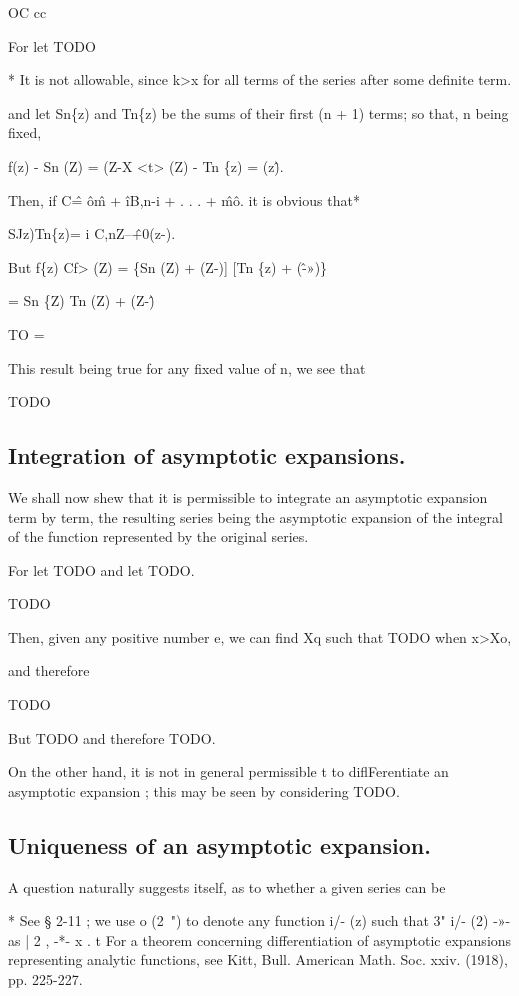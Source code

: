 OC cc

For let TODO

* It is not allowable, since k>x for all terms of the series after some definite term.

%
%
and let Sn\{z) and Tn\{z) be the sums of their first (n + 1) terms; so that,
n being fixed,

f(z) - Sn (Z) = (Z-X <t> (Z) - Tn \{z) = (z\^).

Then, if C\^ = \^o\^m + \^iB,n-i + . . . + \^m\^o. it is obvious that*

SJz)Tn\{z)= i C,nZ--\^+0(z-).

But f\{z) Cf> (Z) = \{Sn (Z) + (Z-)] [Tn \{z) + (\^-»)\}

= Sn \{Z) Tn (Z) + (Z-\^)

TO =

This result being true for any fixed value of n, we see that

TODO

\subsection{Integration of asymptotic expansions.}

We shall now shew that it is permissible to integrate an asymptotic
expansion term by term, the resulting series being the asymptotic expansion
of the integral of the function represented by the original series.

For let TODO and let TODO.

TODO

Then, given any positive number e, we can find Xq such that
TODO when x>Xo,



and therefore

TODO

But TODO
and therefore TODO.

On the other hand, it is not in general permissible t to diflFerentiate an asymptotic
expansion ; this may be seen by considering TODO.

\subsection{Uniqueness of an asymptotic expansion.}

A question naturally suggests itself, as to whether a given series can be

* See § 2-11 ; we use o (2~") to denote any function i/- (z) such that 3" i/- (2) -»- as | 2 , -*- x .
t For a theorem concerning differentiation of asymptotic expansions representing analytic
functions, see Kitt, Bull. American Math. Soc. xxiv. (1918), pp. 225-227.



